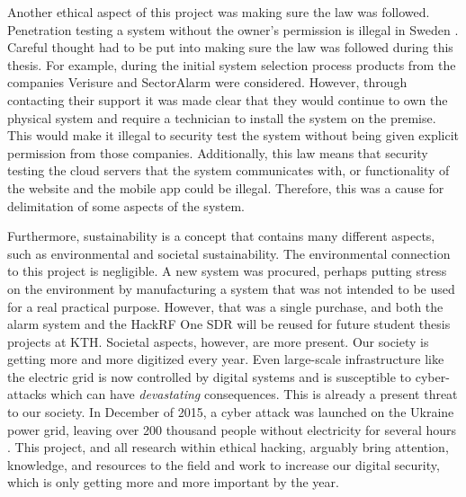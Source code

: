 Another ethical aspect of this project was making sure the law was followed. Penetration testing a system without the owner's permission is illegal in Sweden \cite{brottsbalken-it-brott}. Careful thought had to be put into making sure the law was followed during this thesis. For example, during the initial system selection process products from the companies Verisure and SectorAlarm were considered. However, through contacting their support it was made clear that they would continue to own the physical system and require a technician to install the system on the premise. This would make it illegal to security test the system without being given explicit permission from those companies. Additionally, this law means that security testing the cloud servers that the system communicates with, or functionality of the website and the mobile app could be illegal. Therefore, this was a cause for delimitation of some aspects of the system.

Furthermore, sustainability is a concept that contains many different aspects, such as environmental and societal sustainability. The environmental connection to this project is negligible. A new system was procured, perhaps putting stress on the environment by manufacturing a system that was not intended to be used for a real practical purpose. However, that was a single purchase, and both the alarm system and the HackRF One SDR will be reused for future student thesis projects at KTH. Societal aspects, however, are more present. Our society is getting more and more digitized every year. Even large-scale infrastructure like the electric grid is now controlled by digital systems and is susceptible to cyber-attacks which can have \textit{devastating} consequences. This is already a present threat to our society. In December of 2015, a cyber attack was launched on the Ukraine power grid, leaving over 200 thousand people without electricity for several hours \cite{urkaine-power-grid-analysis}. This project, and all research within ethical hacking, arguably bring attention, knowledge, and resources to the field and work to increase our digital security, which is only getting more and more important by the year.
